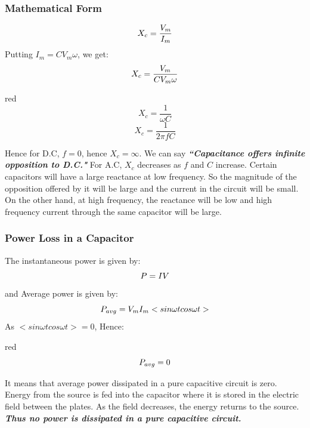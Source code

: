 \subsubsection{Mathematical Form}
\begin{equation}\notag
    X_{c}=\frac{V_{m}}{I_{m}}
\end{equation}
Putting $I_{m} = CV_{m}\omega$, we get:
\begin{equation}\notag
    X_{c}=\frac{V_{m}}{CV_{m}\omega}
\end{equation}
\begin{mybox}{red}{}
\begin{equation}\label{eq:15.17}
    X_{c}=\frac{1}{\omega C}
\end{equation}
\begin{equation}\label{eq:15.18}
    X_{c}=\frac{1}{2 \pi fC}
\end{equation}
\end{mybox}
\noindent Hence for D.C, $f=0$, hence $X_{c} = \infty$. We can say
\textit{\textbf{``Capacitance offers infinite opposition to D.C."}}
For A.C, $X_{c}$ decreases as $f$ and $C$ increase.
Certain capacitors will have a large reactance at low frequency.
So the magnitude of the opposition offered by it will be large and
the current in the circuit will be small. On the other hand, at high
frequency, the reactance will be low and high frequency current through
the same capacitor will be large.

\subsubsection{Power Loss in a Capacitor}
  The instantaneous power is given by:
  \begin{equation}\notag
      P = IV
  \end{equation}
and Average power is given by:
  \begin{equation}\notag
    P_{avg} = V_{m}I_{m}< sin \omega t  cos \omega t>
\end{equation}
As $< sin \omega t  cos \omega t> = 0$, Hence:
\begin{mybox}{red}{}
\begin{equation}\notag
    P_{avg} = 0
\end{equation}
\end{mybox}
It means that average power dissipated in a pure capacitive
circuit is zero. Energy from the source is fed into the capacitor
where it is stored in the electric field between the plates.
As the field decreases, the energy returns to the source.
\textit{\textbf{Thus no power is dissipated in a pure capacitive circuit.}}
